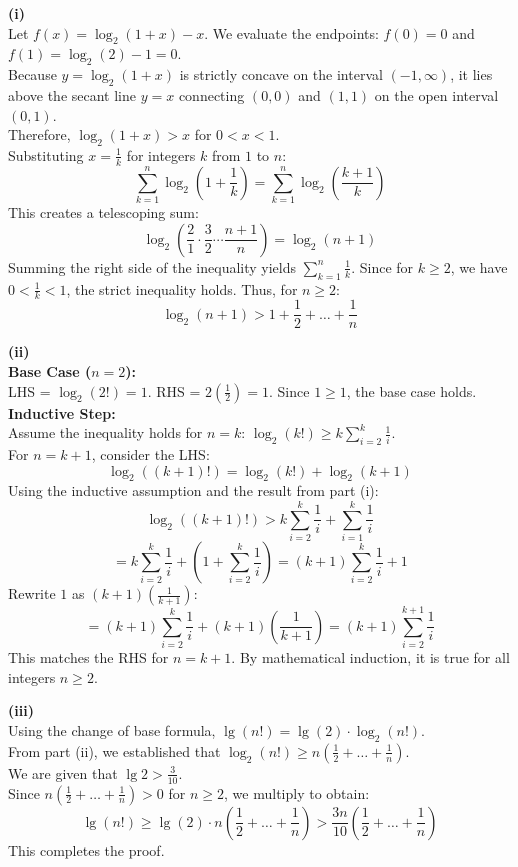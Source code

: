 \begin{solution}[Brief]
\textbf{(i)} \\
Let $f(x) = \log_2(1+x) - x$. We evaluate the endpoints: $f(0) = 0$ and $f(1) = \log_2(2) - 1 = 0$. \\
Because $y = \log_2(1+x)$ is strictly concave on the interval $(-1, \infty)$, it lies above the secant line $y=x$ connecting $(0,0)$ and $(1,1)$ on the open interval $(0, 1)$. \\
Therefore, $\log_2(1+x) > x$ for $0 < x < 1$. \\
Substituting $x = \frac{1}{k}$ for integers $k$ from $1$ to $n$:
\[ \sum_{k=1}^n \log_2\left(1 + \frac{1}{k}\right) = \sum_{k=1}^n \log_2\left(\frac{k+1}{k}\right) \]
This creates a telescoping sum:
\[ \log_2\left(\frac{2}{1} \cdot \frac{3}{2} \cdots \frac{n+1}{n}\right) = \log_2(n+1) \]
Summing the right side of the inequality yields $\sum_{k=1}^n \frac{1}{k}$. Since for $k \ge 2$, we have $0 < \frac{1}{k} < 1$, the strict inequality holds. Thus, for $n \ge 2$:
\[ \log_2(n+1) > 1 + \frac{1}{2} + \dots + \frac{1}{n} \]

\textbf{(ii)} \\
\textbf{Base Case ($n=2$):} \\
LHS = $\log_2(2!) = 1$. RHS = $2\left(\frac{1}{2}\right) = 1$. Since $1 \ge 1$, the base case holds. \\
\textbf{Inductive Step:} \\
Assume the inequality holds for $n=k$: $\log_2(k!) \ge k \sum_{i=2}^k \frac{1}{i}$. \\
For $n=k+1$, consider the LHS:
\[ \log_2((k+1)!) = \log_2(k!) + \log_2(k+1) \]
Using the inductive assumption and the result from part (i):
\[ \log_2((k+1)!) > k \sum_{i=2}^k \frac{1}{i} + \sum_{i=1}^k \frac{1}{i} \]
\[ = k \sum_{i=2}^k \frac{1}{i} + \left(1 + \sum_{i=2}^k \frac{1}{i}\right) = (k+1) \sum_{i=2}^k \frac{1}{i} + 1 \]
Rewrite $1$ as $(k+1)\left(\frac{1}{k+1}\right)$:
\[ = (k+1) \sum_{i=2}^k \frac{1}{i} + (k+1)\left(\frac{1}{k+1}\right) = (k+1) \sum_{i=2}^{k+1} \frac{1}{i} \]
This matches the RHS for $n=k+1$. By mathematical induction, it is true for all integers $n \ge 2$.

\textbf{(iii)} \\
Using the change of base formula, $\lg(n!) = \lg(2) \cdot \log_2(n!)$. \\
From part (ii), we established that $\log_2(n!) \ge n \left( \frac{1}{2} + \dots + \frac{1}{n} \right)$. \\
We are given that $\lg 2 > \frac{3}{10}$. \\
Since $n \left( \frac{1}{2} + \dots + \frac{1}{n} \right) > 0$ for $n \ge 2$, we multiply to obtain:
\[ \lg(n!) \ge \lg(2) \cdot n \left( \frac{1}{2} + \dots + \frac{1}{n} \right) > \frac{3n}{10} \left( \frac{1}{2} + \dots + \frac{1}{n} \right) \]
This completes the proof.
\end{solution}

